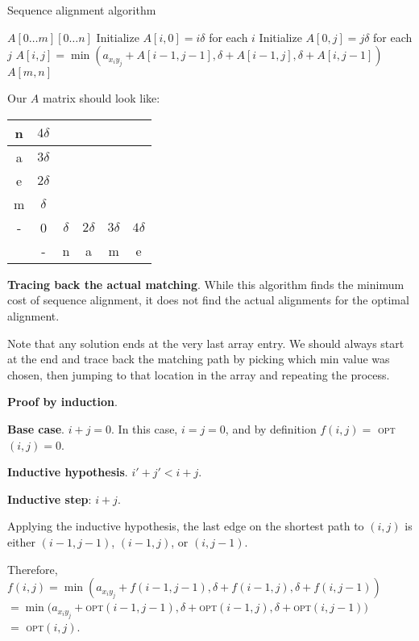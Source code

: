 \documentclass{article}
\newcommand{\OPT}{\textsc{opt}}
\begin{document}
\begin{algorithm}
\caption{Sequence alignment algorithm}\label{seqAlign}
\begin{algorithmic}[1]
\State $A[0 \dots m][0 \dots n]$
\State Initialize $A[i, 0] = i\delta$ for each $i$
\State Initialize $A[0, j] = j\delta$ for each $j$
        \State $A[i, j] = \min(a_{x_iy_j} + A[i-1, j-1], \delta + A[i-1,j], \delta + A[i,j-1])$
    \EndFor
\EndFor
\State \Return $A[m, n]$
\EndProcedure
\end{algorithmic}
\end{algorithm}

Our $A$ matrix should look like:

\begin{tabular}{c|c|c|c|c|c|}
    \hline
    n & $4\delta$ & & & & & \\ \hline
    a & $3\delta$ & & & & & \\ \hline
    e & $2\delta$ & & & & & \\ \hline
    m & $\delta$ & & & & & \\ \hline
    - & 0 & $\delta$ & $2\delta$ & $3\delta$ & $4\delta$ \\ \hline
      & - & n & a & m & e
\end{tabular}

\textbf{Tracing back the actual matching}. While this algorithm finds the minimum cost of sequence alignment, it does not find the actual alignments for the optimal alignment.

Note that any solution ends at the very last array entry. We should always start at the end and trace back the matching path by picking which min value was chosen, then jumping to that location in the array and repeating the process.

\textbf{Proof by induction}.

\textbf{Base case}. $i + j = 0$. In this case, $i = j = 0$, and by definition $f(i, j) =$ \OPT$(i, j) = 0$.

\textbf{Inductive hypothesis}. $i' + j' < i + j$.

\textbf{Inductive step}: $i + j$.

Applying the inductive hypothesis, the last edge on the shortest path to $(i, j)$ is either $(i - 1, j - 1)$, $(i - 1, j)$, or $(i, j - 1)$.

Therefore, $f(i, j) = \min(a_{x_iy_j} + f(i - 1, j - 1), \delta + f(i - 1, j), \delta + f(i, j - 1))$\\
$= \min(a_{x_iy_j} + $\OPT$(i - 1, j - 1), \delta + $\OPT$(i - 1, j), \delta + $\OPT$(i, j - 1))$\\
$=$ \OPT$(i, j)$.
\end{document}
